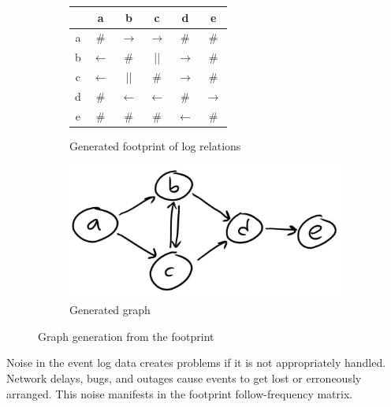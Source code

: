 \begin{figure}
    \centering
    \begin{subfigure}[h]{0.4\linewidth}
        \begin{center}
        \begin{tabular}{cccccc}
        \hline
          & a & b & c & d & e\\
        \hline
        a & \# & $\rightarrow$ & $\rightarrow$ & \# & \# \\
        b & $\leftarrow$ & \# & || & $\rightarrow$ & \# \\
        c & $\leftarrow$ & || & \# & $\rightarrow$ & \# \\
        d & \# & $\leftarrow$ & $\leftarrow$ & \# & $\rightarrow$ \\
        e & \# & \# & \# & $\leftarrow$ & \# \\
        \hline
        \end{tabular}
        \end{center}
        \caption{Generated footprint of log relations}
        \label{tab:examplefootprint}
    \end{subfigure}
    \begin{subfigure}[h]{0.4\linewidth}
        \centering \includegraphics[width=\linewidth]{gfx/graphthing.jpg}
        \caption{Generated graph }
        \label{fig:examplegraph}
    \end{subfigure}
    \caption{Graph generation from the footprint}
\end{figure}

Noise in the event log data creates problems if it is not appropriately handled. 
Network delays, bugs, and outages cause events to get lost or erroneously arranged. 
This noise manifests in the footprint follow-frequency matrix.

